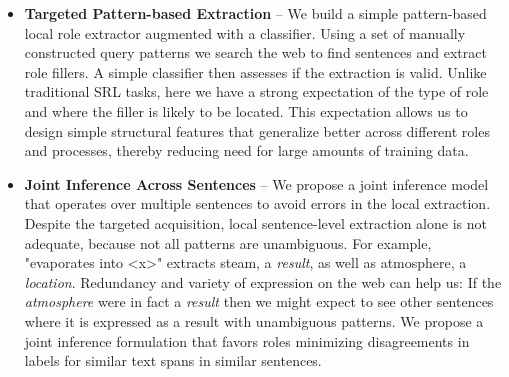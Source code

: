 \begin{itemize}
\item {\bf Targeted Pattern-based Extraction} --  We build a simple pattern-based local role extractor augmented with a classifier.
Using a set of manually constructed query patterns we search the web to find sentences and extract role fillers.
A simple classifier then assesses if the extraction is valid.
Unlike traditional SRL tasks, here we have a strong expectation of the type of role and where the filler is likely to be located.
This expectation allows us to design simple structural features that generalize better across different roles and processes, 
thereby reducing need for large amounts of training data.

\item {\bf Joint Inference Across Sentences} -- We propose a joint inference model that operates over multiple sentences to avoid errors in the local extraction.
Despite the targeted acquisition, local sentence-level extraction alone is not adequate, because not all patterns are unambiguous. 
For example, "evaporates into <x>" extracts steam, a {\em result}, as well as atmosphere, a {\em location}. 
Redundancy and variety of expression on the web can help us: If the {\em atmosphere} were in fact a {\em result} then we might expect to see other sentences
where it is expressed as a result with unambiguous patterns. We propose a joint inference formulation that favors roles 
minimizing disagreements in labels for similar text spans in similar sentences.

\end{itemize}

